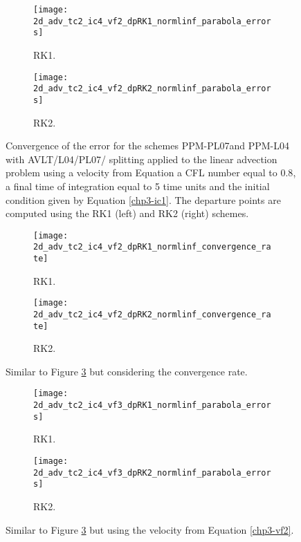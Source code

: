 \begin{figure}[!htb]
	\centering
	\begin{subfigure}{0.45\textwidth}
		\centering
		\texttt{[image: 2d\_adv\_tc2\_ic4\_vf2\_dpRK1\_normlinf\_parabola\_errors]}
		\caption{RK1.\label{chp3-sec-exp-adv5-error1}}
	\end{subfigure}
	\begin{subfigure}{0.45\textwidth}
		\centering
		\texttt{[image: 2d\_adv\_tc2\_ic4\_vf2\_dpRK2\_normlinf\_parabola\_errors]}
		\caption{RK2.\label{chp3-sec-exp-adv5-error2}}
	\end{subfigure}
	\caption{Convergence of the error for the schemes
	PPM-PL07and PPM-L04 with AVLT/L04/PL07/ splitting
	applied to the linear advection problem using a velocity from Equation
	a CFL number equal to $0.8$, a final time of integration equal to 5 time units
	and the initial condition given by Equation \eqref{chp3-ic1}.
	The departure points are computed using the RK1 (left) and RK2 (right) schemes.\label{chp3-sec-exp-adv5}}
\end{figure}

\begin{figure}[!htb]
	\centering
	\begin{subfigure}{0.45\textwidth}
		\centering
		\texttt{[image: 2d\_adv\_tc2\_ic4\_vf2\_dpRK1\_normlinf\_convergence\_rate]}
		\caption{RK1.\label{chp3-sec-exp-adv6-error1}}
	\end{subfigure}
	\begin{subfigure}{0.45\textwidth}
		\centering
		\texttt{[image: 2d\_adv\_tc2\_ic4\_vf2\_dpRK2\_normlinf\_convergence\_rate]}
		\caption{RK2.\label{chp3-sec-exp-adv6-error2}}
	\end{subfigure}
	\caption{Similar to Figure \ref{chp3-sec-exp-adv5} but considering the convergence rate.\label{chp3-sec-exp-adv6}}
\end{figure}


\begin{figure}[!htb]
	\centering
	\begin{subfigure}{0.45\textwidth}
		\centering
		\texttt{[image: 2d\_adv\_tc2\_ic4\_vf3\_dpRK1\_normlinf\_parabola\_errors]}
		\caption{RK1.\label{chp3-sec-exp-adv7-error1}}
	\end{subfigure}
	\begin{subfigure}{0.45\textwidth}
		\centering
		\texttt{[image: 2d\_adv\_tc2\_ic4\_vf3\_dpRK2\_normlinf\_parabola\_errors]}
		\caption{RK2.\label{chp3-sec-exp-adv7-error2}}
	\end{subfigure}
	\caption{Similar to Figure \ref{chp3-sec-exp-adv5} but using the velocity from Equation \eqref{chp3-vf2}.\label{chp3-sec-exp-adv7}}
\end{figure}

